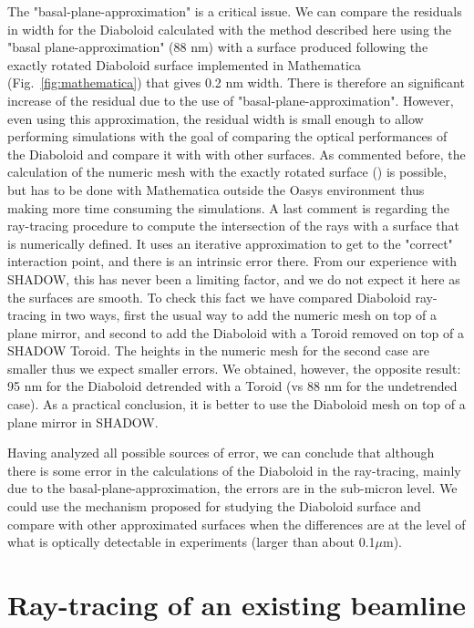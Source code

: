 \documentclass[a4paper, 11pt]{article}
\begin{document}
The "basal-plane-approximation" is a critical issue. We can compare the residuals in width for the Diaboloid calculated with the method described here using the "basal plane-approximation" (88 nm) with a surface produced following the exactly rotated Diaboloid surface \cite{Valeriy2020b} implemented in Mathematica \cite{lacey}  (Fig.~\ref{fig:mathematica}) that gives 0.2 nm width. There is therefore an significant increase of the residual due to the use of "basal-plane-approximation". However, even using this approximation, the residual width is small enough to allow performing simulations with the goal of comparing the optical performances of the Diaboloid and compare it with with other surfaces. As commented before, the calculation of the numeric mesh with the exactly rotated surface (\cite{Valeriy2020b}) is possible, but has to be done with Mathematica outside the Oasys environment thus making more time consuming the simulations.  A last comment is regarding the ray-tracing procedure to compute the intersection of the rays with a surface that is numerically defined. It uses an iterative approximation to get to the "correct" interaction point, and there is an intrinsic error there. From our experience with SHADOW, this has never been a limiting factor, and we do not expect it here as the surfaces are smooth. To check this fact we have compared  Diaboloid ray-tracing in two ways, first the usual way to add the numeric mesh on top of a plane mirror, and second to add the Diaboloid with a Toroid removed on top of a SHADOW Toroid. The heights in the numeric mesh for the second case are smaller thus we expect smaller errors. We obtained, however, the opposite result: 95 nm for the Diaboloid detrended with a Toroid (vs 88 nm for the undetrended case). As a practical conclusion, it is better to use the Diaboloid mesh on top of a plane mirror in SHADOW.

Having analyzed all possible sources of error, we can conclude that although there is some error in the calculations of the Diaboloid in the ray-tracing, mainly due to the basal-plane-approximation, the errors are in the sub-micron level. We could use the mechanism proposed for studying the Diaboloid surface and compare with other approximated surfaces when the differences are at the level of what is optically detectable in experiments (larger than about 0.1$\mu$m).

\section{Ray-tracing of an existing beamline}
\end{document}
